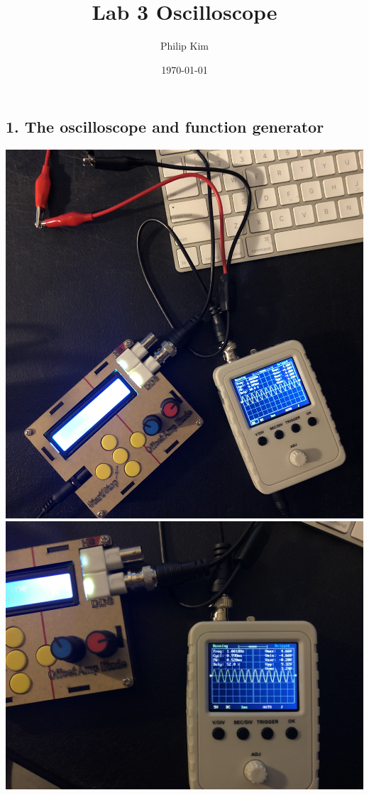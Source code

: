 \documentclass[a4paper]{article}
\title{Lab 3 Oscilloscope}
\author{Philip Kim}
\date{\today}
\begin{document}
\maketitle
\begin{center}
  \section*{1. The oscilloscope and function generator}
  \includegraphics[scale=0.08]{1.jpeg}
  \includegraphics[scale=0.08]{1a.jpeg}
\end{center}
\end{document}
